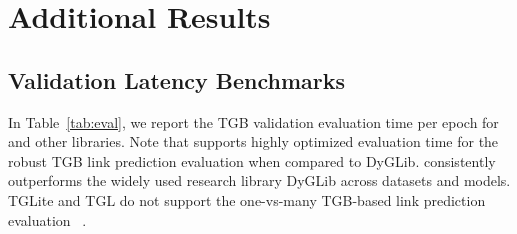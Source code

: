 \appendix




\section{Additional Results}\label{app:more_perf}

\subsection{Validation Latency Benchmarks}

In Table~\ref{tab:eval}, we report the TGB validation evaluation time per epoch for \name and other libraries. Note that \name supports highly optimized evaluation time for the robust TGB link prediction evaluation when compared to DyGLib. \name consistently outperforms the widely used research library DyGLib across datasets and models. TGLite and TGL do not support the one-vs-many TGB-based link prediction evaluation ~\citep{tgb2}.


